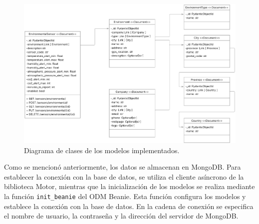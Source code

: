\begin{figure}[H]
    \centering
    \includegraphics[width=.90\textwidth]{./Images/18.png}
    \caption{Diagrama de clases de los modelos implementados.}
    \label{fig:diagrama de clases}
\end{figure}





Como se mencionó anteriormente, los datos se almacenan en MongoDB. Para
establecer la conexión con la base de datos, se utiliza el cliente asíncrono de
la biblioteca Motor, mientras que la inicialización de los modelos se realiza
mediante la función \texttt{init\_beanie} del ODM Beanie. Esta función
configura los modelos y establece la conexión con la base de datos. En la
cadena de conexión se especifica el nombre de usuario, la contraseña y la
dirección del servidor de MongoDB.

